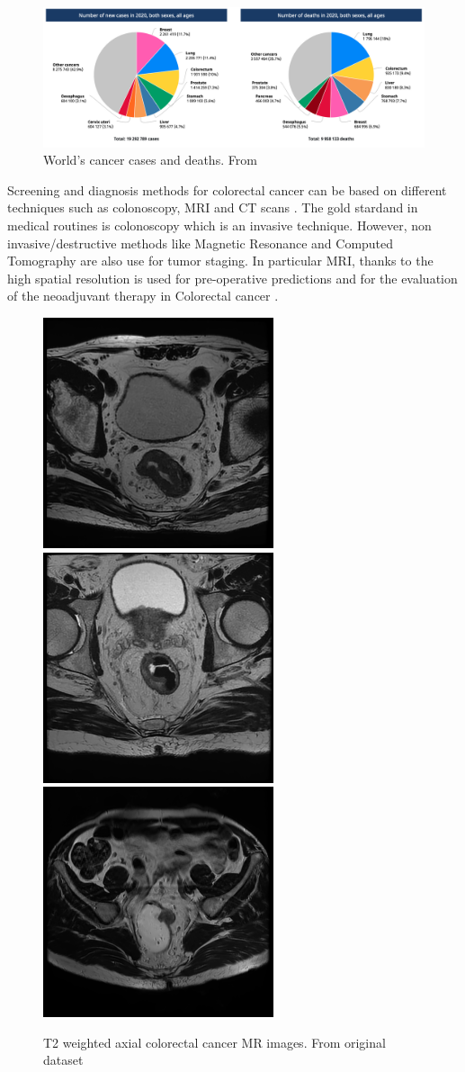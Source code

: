 \documentclass[12pt,a4paper]{report}
\begin{document}
\begin{figure}[h!]
	\centering
	\includegraphics[width=0.8\linewidth]{images/cancerstats.png}
	\caption{World's cancer cases and deaths. From \cite{cancerstats} }
\end{figure}


Screening and diagnosis methods for colorectal cancer can be based on different techniques such as colonoscopy, MRI and CT scans \cite{jovana}. The gold stardand in medical routines is colonoscopy  which is an invasive technique. However, non invasive/destructive methods like Magnetic Resonance and Computed Tomography are also use for tumor staging. In particular MRI, thanks to the high spatial resolution is used for pre-operative predictions and for the evaluation of the neoadjuvant therapy in Colorectal cancer \cite{tesicoppola}.

\begin{figure}[htp]

    \centering
    \includegraphics[width=.3\textwidth]{images/T2AX_Alta_8.png}\hfill
    \includegraphics[width=.3\textwidth]{images/T2AX_BO11_5.png}\hfill
    \includegraphics[width=.3\textwidth]{images/T2AX_BO1_9.png}
    
    \caption{T2 weighted axial colorectal cancer MR images. From original dataset}
    \label{trittico}
    
    \end{figure}
\end{document}
